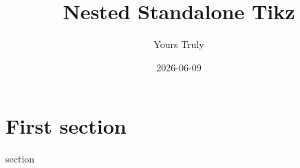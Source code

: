 \documentclass{article}
\title{Nested Standalone Tikz}
\author{Yours Truly}
\date{2026-06-09}
\begin{document}
    \maketitle

    \section{First section}
    {section}
\end{document}
